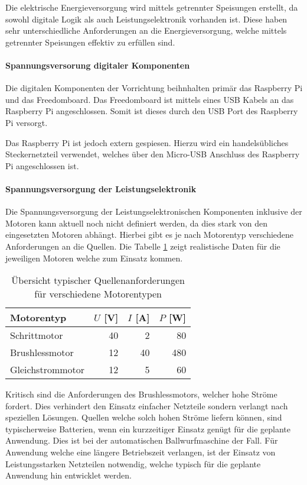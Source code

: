 
Die elektrische Energieversorgung wird mittels getrennter Speisungen erstellt,
da sowohl digitale Logik als auch Leistungselektronik vorhanden ist. Diese
haben sehr unterschiedliche Anforderungen an die Energieversorgung, welche
mittels getrennter Speisungen effektiv zu erfüllen sind.

\paragraph{Spannungsversorung digitaler Komponenten}
Die digitalen Komponenten der Vorrichtung beihnhalten primär das
Raspberry Pi und das Freedomboard. Das Freedomboard ist mittels eines USB
Kabels an das Raspberry Pi angeschlossen. Somit ist dieses durch den
USB Port des Raspberry Pi versorgt.

Das Raspberry Pi ist jedoch extern gespiesen. Hierzu wird ein
handelsübliches Steckernetzteil verwendet, welches über den Micro-USB
Anschluss des Raspberry Pi angeschlossen ist.

\paragraph{Spannungsversorgung der Leistungselektronik}
Die Spannungsversorgung der Leistungselektronischen Komponenten inklusive
der Motoren kann aktuell noch nicht definiert werden, da dies stark von den
eingesetzten Motoren abhängt. Hierbei gibt es je nach Motorentyp verschiedene
Anforderungen an die Quellen. Die Tabelle \ref{tab:power-requirement} zeigt
realistische Daten für die jeweiligen Motoren welche zum Einsatz kommen.

\begin{table}[h!]
	\centering
	\begin{tabular}{l r r r}
		Motorentyp
			& $U$ [V]
			& $I$ [A] 
			& $P$ [W] \\
		\hline
		Schrittmotor
			& 40
			& 2 
			& 80 \\
		Brushlessmotor
			& 12
			& 40
			& 480 \\
		Gleichstrommotor
			& 12
			& 5
			& 60 \\
	\end{tabular}
	\caption{Übersicht typischer Quellenanforderungen für verschiedene
		Motorentypen}
	\label{tab:power-requirement}
\end{table}

Kritisch sind die Anforderungen des Brushlessmotors, welcher hohe Ströme
fordert. Dies verhindert den Einsatz einfacher Netzteile sondern verlangt
nach speziellen Lösungen. Quellen welche solch hohen Ströme liefern können,
sind typischerweise Batterien, wenn ein kurzzeitiger Einsatz genügt für die
geplante Anwendung. Dies ist bei der automatischen Ballwurfmaschine der
Fall. Für Anwendung welche eine längere Betriebszeit verlangen, ist der
Einsatz von Leistungsstarken Netzteilen notwendig, welche typisch für die
geplante Anwendung hin entwicklet werden.


